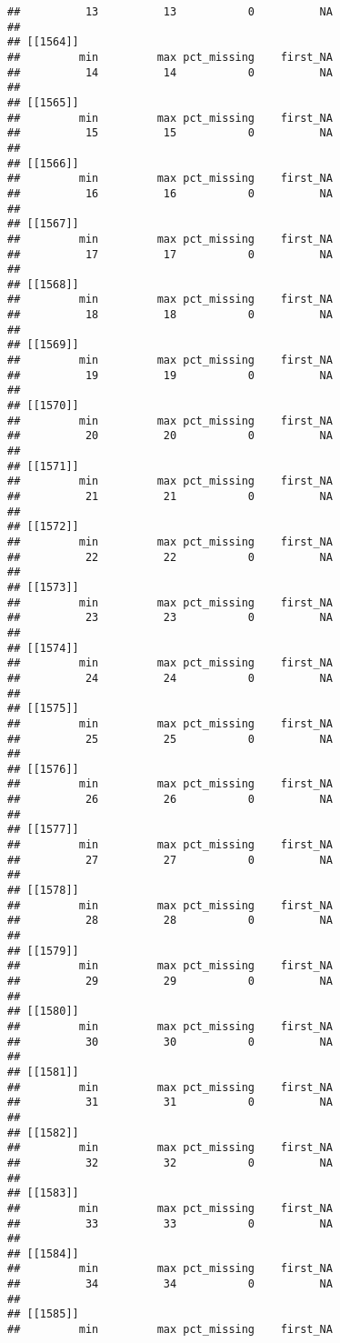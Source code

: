\documentclass[
]{article}
\begin{document}
\begin{verbatim}
##          13          13           0          NA 
## 
## [[1564]]
##         min         max pct_missing    first_NA 
##          14          14           0          NA 
## 
## [[1565]]
##         min         max pct_missing    first_NA 
##          15          15           0          NA 
## 
## [[1566]]
##         min         max pct_missing    first_NA 
##          16          16           0          NA 
## 
## [[1567]]
##         min         max pct_missing    first_NA 
##          17          17           0          NA 
## 
## [[1568]]
##         min         max pct_missing    first_NA 
##          18          18           0          NA 
## 
## [[1569]]
##         min         max pct_missing    first_NA 
##          19          19           0          NA 
## 
## [[1570]]
##         min         max pct_missing    first_NA 
##          20          20           0          NA 
## 
## [[1571]]
##         min         max pct_missing    first_NA 
##          21          21           0          NA 
## 
## [[1572]]
##         min         max pct_missing    first_NA 
##          22          22           0          NA 
## 
## [[1573]]
##         min         max pct_missing    first_NA 
##          23          23           0          NA 
## 
## [[1574]]
##         min         max pct_missing    first_NA 
##          24          24           0          NA 
## 
## [[1575]]
##         min         max pct_missing    first_NA 
##          25          25           0          NA 
## 
## [[1576]]
##         min         max pct_missing    first_NA 
##          26          26           0          NA 
## 
## [[1577]]
##         min         max pct_missing    first_NA 
##          27          27           0          NA 
## 
## [[1578]]
##         min         max pct_missing    first_NA 
##          28          28           0          NA 
## 
## [[1579]]
##         min         max pct_missing    first_NA 
##          29          29           0          NA 
## 
## [[1580]]
##         min         max pct_missing    first_NA 
##          30          30           0          NA 
## 
## [[1581]]
##         min         max pct_missing    first_NA 
##          31          31           0          NA 
## 
## [[1582]]
##         min         max pct_missing    first_NA 
##          32          32           0          NA 
## 
## [[1583]]
##         min         max pct_missing    first_NA 
##          33          33           0          NA 
## 
## [[1584]]
##         min         max pct_missing    first_NA 
##          34          34           0          NA 
## 
## [[1585]]
##         min         max pct_missing    first_NA 

\end{verbatim}
\end{document}
